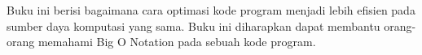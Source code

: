 Buku ini berisi bagaimana cara optimasi kode program menjadi lebih efisien pada sumber daya komputasi yang sama. Buku ini diharapkan dapat membantu orang-orang memahami Big O Notation pada sebuah kode program.

